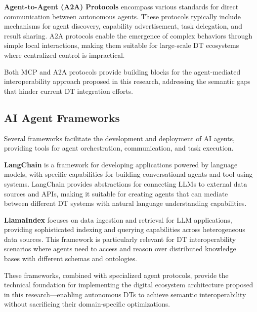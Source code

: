 \textbf{Agent-to-Agent (A2A) Protocols} encompass various standards for direct communication between autonomous agents. These protocols typically include mechanisms for agent discovery, capability advertisement, task delegation, and result sharing. A2A protocols enable the emergence of complex behaviors through simple local interactions, making them suitable for large-scale DT ecosystems where centralized control is impractical.

Both MCP and A2A protocols provide building blocks for the agent-mediated interoperability approach proposed in this research, addressing the semantic gaps that hinder current DT integration efforts.

\subsection{AI Agent Frameworks}

Several frameworks facilitate the development and deployment of AI agents, providing tools for agent orchestration, communication, and task execution.

\textbf{LangChain} is a framework for developing applications powered by language models, with specific capabilities for building conversational agents and tool-using systems. LangChain provides abstractions for connecting LLMs to external data sources and APIs, making it suitable for creating agents that can mediate between different DT systems with natural language understanding capabilities.

\textbf{LlamaIndex} focuses on data ingestion and retrieval for LLM applications, providing sophisticated indexing and querying capabilities across heterogeneous data sources. This framework is particularly relevant for DT interoperability scenarios where agents need to access and reason over distributed knowledge bases with different schemas and ontologies.

These frameworks, combined with specialized agent protocols, provide the technical foundation for implementing the digital ecosystem architecture proposed in this research—enabling autonomous DTs to achieve semantic interoperability without sacrificing their domain-specific optimizations.